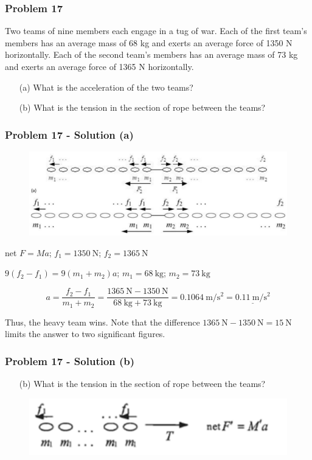 \documentclass{beamer}
\begin{document}
\begin{}
\begin{frame}
\frametitle{Problem 17}
Two teams of nine members each engage in a tug of war. Each of the first team's members has an average mass of 68 kg and exerts an average force of 1350 N horizontally. Each of the second team's members has an average mass of 73 kg and exerts an average force of 1365 N horizontally.
\begin{itemize}
    \item[(a)] What is the acceleration of the two teams?
    \item[(b)] What is the tension in the section of rope between the teams?
\end{itemize}
\end{frame}


\begin{frame}
\frametitle{Problem 17 - Solution (a)}
\begin{figure}
    \centering
    \includegraphics[width=0.7\linewidth]{Screenshot 2024-10-18 111908.png}
\end{figure}

net $F = Ma$; $f_1 = 1350 \mathrm{~N}$; $f_2 = 1365 \mathrm{~N}$

$9(f_2 - f_1) = 9(m_1 + m_2)a$; $m_1 = 68 \mathrm{~kg}$; $m_2 = 73 \mathrm{~kg}$

\begin{equation*}
a = \frac{f_2 - f_1}{m_1 + m_2} = \frac{1365 \mathrm{~N} - 1350 \mathrm{~N}}{68 \mathrm{~kg} + 73 \mathrm{~kg}} = 0.1064 \mathrm{~m} / \mathrm{s}^{2} = \underline{0.11 \mathrm{~m} / \mathrm{s}^{2}}
\end{equation*}

Thus, the heavy team wins. Note that the difference $1365 \mathrm{~N} - 1350 \mathrm{~N} = 15 \mathrm{~N}$ limits the answer to two significant figures.
\end{frame}

\begin{frame}
\frametitle{Problem 17 - Solution (b)}
\begin{itemize}
    \item[(b)] What is the tension in the section of rope between the teams?
\end{itemize}
\begin{figure}
    \centering
    \includegraphics[width=0.5\linewidth]{Screenshot 2024-10-20 145707.png}
\end{figure}


\end{frame}
\end{}
\end{document}
